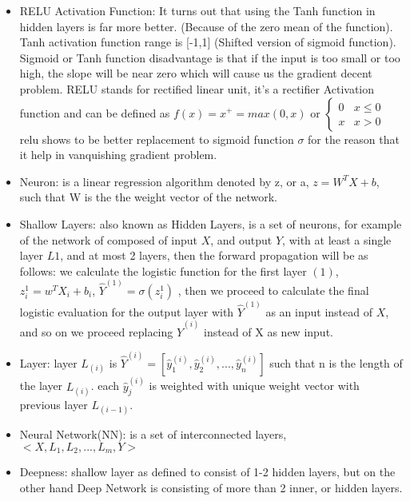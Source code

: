 \documentclass[4apaper,12pt]{book}
\begin{document}
\begin{itemize}
\item RELU Activation Function: It turns out that using the Tanh function in hidden layers is far more better. (Because of the zero mean of the function). Tanh activation function range is [-1,1] (Shifted version of sigmoid function). Sigmoid or Tanh function disadvantage is that if the input is too small or too high, the slope will be near zero which will cause us the gradient decent problem. RELU stands for rectified linear unit, it's a rectifier Activation function and can be defined as $f(x)=x^+=max(0,x)$ or $\begin{cases} 0 & x\leq 0 \\ x & x > 0 \end{cases}$ relu shows to be better replacement to sigmoid function $\sigma$ for the reason that it help in vanquishing gradient problem.
\item Neuron: is a linear regression algorithm denoted by z, or a, $z= W^TX + b$, such that W is the the weight vector of the network.
\item Shallow Layers: also known as Hidden Layers, is a set of neurons, for example of the network of composed of input $X$, and output $Y$, with at least a single layer $L1$, and at most 2 layers, then the forward propagation will be as follows: we calculate the logistic function for the first layer $(1)$,  $z^{1}_i=w^TX_i+b_i$, $\hat{Y}^{(1)}=\sigma{(z^{1}_i)}$ , then we proceed to calculate the final logistic evaluation for the output layer with $\hat{Y}^{(1)}$ as an input instead of $X$, and so on we proceed replacing $\hat{Y}^{(i)}$ instead of X as new input.
\item Layer: layer $L_{(i)}$ is $\hat{Y}^{(i)}=[\hat{y}^{(i)}_1, \hat{y}^{(i)}_2, ..., \hat{y}^{(i)}_n]$ such that n is the length of the layer $L_{(i)}$. each $\hat{y}^{(i)}_{j}$ is weighted with unique weight vector with previous layer $L_{(i-1)}$.

\item Neural Network(NN): is a set of interconnected layers, $<X, L_1, L_2, ..., L_m, Y>$

\item Deepness: shallow layer as defined to consist of 1-2 hidden layers, but on the other hand Deep Network is consisting of more than 2 inner, or hidden layers.

\end{itemize}
\end{document}
